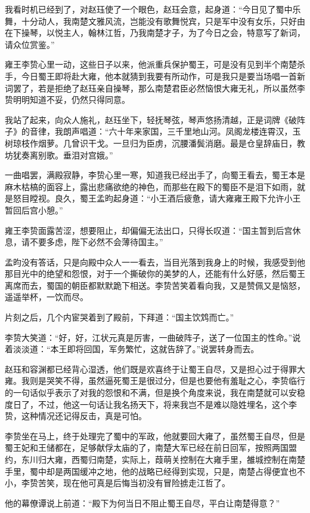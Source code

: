 我看时机已经到了，对赵珏使了一个眼色，赵珏会意，起身道：“今日见了蜀中乐舞，十分动人，我南楚文雅风流，岂能没有歌舞悦宾，只是军中没有女乐，只好由在下操琴，以悦主人，翰林江哲，乃我南楚才子，为了今日之会，特意写了新词，请众位赏鉴。”

雍王李贽心里一动，这些日子以来，他派重兵保护蜀王，可是没有见到半个南楚杀手，今日蜀王即将赴大雍，他本就猜到我要有所动作，可是我只是要当场唱一首新词罢了，若是拒绝了赵珏亲自操琴，那么南楚君臣必然恼恨大雍无礼，所以虽然李贽明明知道不妥，仍然只得同意。

我站了起来，向众人施礼，赵珏坐下，轻抚琴弦，琴声悠扬清越，正是词牌《破阵子》的音律，我朗声唱道：“六十年来家国，三千里地山河。凤阁龙楼连霄汉，玉树琼枝作烟萝。几曾识干戈。一旦归为臣虏，沉腰潘鬓消磨。最是仓皇辞庙日，教坊犹奏离别歌。垂泪对宫娥。”

一曲唱罢，满殿寂静，李贽心里一寒，知道我已经出手了，向蜀王看去，蜀王本是麻木枯槁的面容上，露出悲痛欲绝的神色，而那些在殿下的蜀臣不是泪下如雨，就是怒目瞠视。良久，蜀王孟昀起身道：“小王酒后疲惫，请大雍雍王殿下允许小王暂回后宫小憩。”

雍王李贽面露苦涩，想要阻止，却偏偏无法出口，只得长叹道：“国主暂到后宫休息，请不要多虑，陛下必然不会薄待国主。”

孟昀没有答话，只是向殿中众人一一看去，当目光落到我身上的时候，我感受到他那目光中的绝望和怨恨，对于一个撕破你的美梦的人，还能有什么好感，然后蜀王离席而去，蜀国的朝臣都默默跪下相送。李贽苦笑着看向我，又是赞佩又是恼怒，遥遥举杯，一饮而尽。

片刻之后，几个内宦哭着到了殿前，下拜道：“国主饮鸩而亡。”

李贽大笑道：“好，好，江状元真是厉害，一曲破阵子，送了一位国主的性命。”说着淡淡道：“本王即将回国，军务繁忙，这就告辞了。”说罢转身而去。

赵珏和容渊都已经背心湿透，他们既是欢喜终于让蜀王自尽，又是担心过于得罪大雍。我则是哭笑不得，虽然逼死蜀王是很过分，但是也要他有羞耻之心，李贽临行的一句话似乎表示了对我的怨恨和不满，但是换个角度来说，我在南楚就可以安稳度日了，不过，他这一句话让我名扬天下，将来我岂不是难以隐姓埋名，这个李贽，这种情况还记得反击，真是可怕。

李贽坐在马上，终于处理完了蜀中的军政，他就要回大雍了，虽然蜀王自尽，但是蜀王妃和王储都在，足够献俘太庙的了，南楚大军已经在前日回军，按照两国盟约，东川归大雍，西蜀归南楚，实际上，葭萌关控制在大雍手里，雒城控制在南楚手里，蜀中却是两国缓冲之地，他的战略已经得到实现，只是，南楚占得便宜也不小，李贽苦笑，现在他可真是后悔当初没有冒险掳走江哲了。

他的幕僚谭说上前道：“殿下为何当日不阻止蜀王自尽，平白让南楚得意？”

